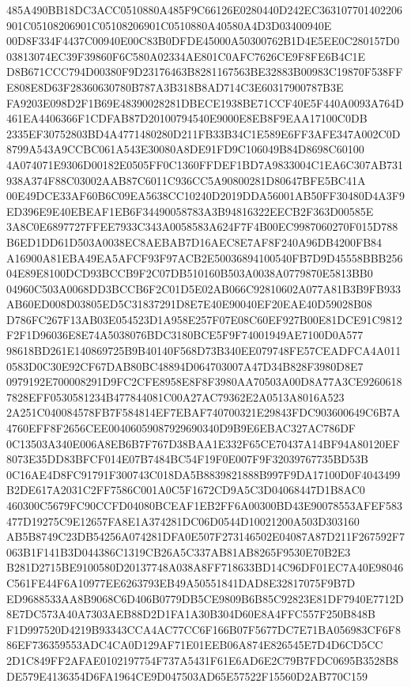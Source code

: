 \documentclass[UTF8,fontset=fandol,zihao=-4,a4paper]{ctexart}
\begin{document}
{{485A490BB18DC3ACC0510880A485F9C66126E0280440D242EC363107701402206901C05108206901C05108206901C0510880A40580A4D3D03400940E
00D8F334F4437C00940E00C83B0DFDE45000A50300762B1D4E5EE0C280157D003813074EC39F39860F6C580A02334AE801C0AFC7626CE9F8FE6B4C1E
D8B671CCC794D00380F9D23176463B8281167563BE32883B00983C19870F538FFE808E8D63F28360630780B787A3B318B8AD714C3E60317900787B3E
FA9203E098D2F1B69E48390028281DBECE1938BE71CCF40E5F440A0093A764D461EA4406366F1CDFAB87D20100794540E9000E8EB8F9EAA17100C0DB
2335EF30752803BD4A4771480280D211FB33B34C1E589E6FF3AFE347A002C0D8799A543A9CCBC061A543E30080A8DE91FD9C106049B84D8698C60100
4A074071E9306D00182E0505FF0C1360FFDEF1BD7A9833004C1EA6C307AB731938A374F88C03002AAB87C6011C936CC5A90800281D80647BFE5BC41A
00E49DCE33AF60B6C09EA5638CC10240D2019DDA56001AB50FF30480D4A3F9ED396E9E40EBEAF1EB6F34490058783A3B94816322EECB2F363D00585E
3A8C0E6897727FFEE7933C343A0058583A624F7F4B00EC9987060270F015D788B6ED1DD61D503A0038EC8AEBAB7D16AEC8E7AF8F240A96DB4200FB84
A16900A81EBA49EA5AFCF93F97ACB2E50036894100540FB7D9D45558BBB25604E89E8100DCD93BCCB9F2C07DB510160B503A0038A0779870E5813BB0
04960C503A0068DD3BCCB6F2C01D5E02AB066C92810602A077A81B3B9FB933AB60ED008D03805ED5C31837291D8E7E40E90040EF20EAE40D59028B08
D786FC267F13AB03E054523D1A958E257F07E08C60EF927B00E81DCE91C9812F2F1D96036E8E74A5038076BDC3180BCE5F9F74001949AE7100D0A577
98618BD261E140869725B9B40140F568D73B340EE079748FE57CEADFCA4A0110583D0C30E92CF67DAB80BC48894D064703007A47D34B828F3980D8E7
0979192E700008291D9FC2CFE8958E8F8F3980AA70503A00D8A77A3CE92606187828EFF0530581234B477844081C00A27AC79362E2A0513A8016A523
2A251C040084578FB7F584814EF7EBAF740700321E29843FDC903600649C6B7A4760EFF8F2656CEE00406059087929690340D9B9E6EBAC327AC786DF
0C13503A340E006A8EB6B7F767D38BAA1E332F65CE70437A14BF94A80120EF8073E35DD83BFCF014E07B7484BC54F19F0E007F9F32039767735BD53B
0C16AE4D8FC91791F300743C018DA5B8839821888B997F9DA17100D0F4043499B2DE617A2031C2FF7586C001A0C5F1672CD9A5C3D04068447D1B8AC0
460300C5679FC90CCFD04080BCEAF1EB2FF6A00300BD43E90078553AFEF583477D19275C9E12657FA8E1A374281DC06D0544D10021200A503D303160
AB5B8749C23DB54256A074281DFA0E507F273146502E04087A87D211F267592F7063B1F141B3D044386C1319CB26A5C337AB81AB8265F9530E70B2E3
B281D2715BE9100580D20137748A038A8FF718633BD14C96DF01EC7A40E98046C561FE44F6A10977EE6263793EB49A50551841DAD8E32817075F9B7D
ED9688533AA8B9068C6D406B0779DB5CE9809B6B85C92823E81DF7940E7712D8E7DC573A40A7303AEB88D2D1FA1A30B304D60E8A4FFC557F250B848B
F1D997520D4219B93343CCA4AC77CC6F166B07F5677DC7E71BA056983CF6F886EF736359553ADC4CA0D129AF71E01EEB06A874E826545E7D4D6CD5CC
2D1C849FF2AFAE0102197754F737A5431F61E6AD6E2C79B7FDC0695B3528B8DE579E4136354D6FA1964CE9D047503AD65E57522F15560D2AB770C159
}}
\end{document}
